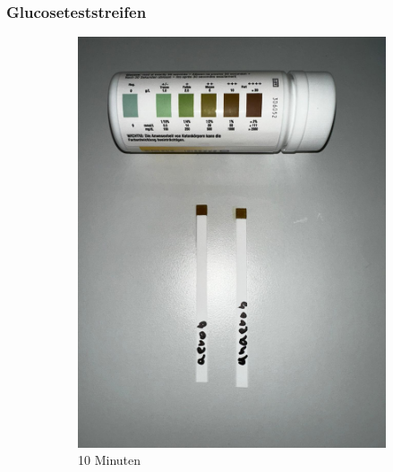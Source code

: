 \documentclass[10pt,a4paper]{article}
\begin{document}
	\subsubsection{Glucoseteststreifen}
		\begin{figure}[H]
		\centering
		\begin{subfigure}[b]{0.4\textwidth}
			\includegraphics[width=\textwidth]{PHOTO-2024-07-04-23-51-30.jpg}
			\caption{10 Minuten}
			\label{fig:10min}
		\end{subfigure}
		\hfill
		\begin{subfigure}[b]{0.4\textwidth}

\end{subfigure}
\end{figure}
\end{document}
